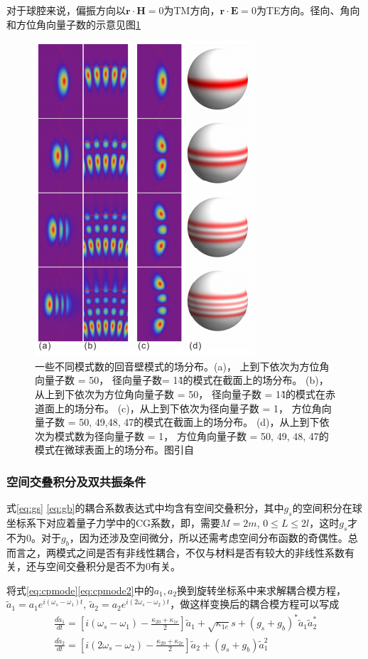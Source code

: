 \documentclass[UTF8,a4paper,cs4size,hyperref]{ctexart}
\begin{document}
对于球腔来说，偏振方向以$\mathbf{r}\cdot\mathbf{H} = 0$为TM方向，$\mathbf{r}\cdot\mathbf{E} = 0$为TE方向。径向、角向和方位角向量子数的示意见图\ref{pic:mode}
\begin{figure}
\centering
\includegraphics[scale=1 ]{mode.png}
\caption{一些不同模式数的回音壁模式的场分布。(a)， 上到下依次为方位角向量子数 = 50， 径向量子数= 1\~4的模式在截面上的场分布。 (b)，从上到下依次为方位角向量子数 = 50， 径向量子数 = 1\~4的模式在赤道面上的场分布。 (c)，从上到下依次为径向量子数 = 1， 方位角向量子数 = 50, 49,48, 47的模式在截面上的场分布。 (d)，从上到下依次为模式数为径向量子数 = 1， 方位角向量子数 = 50, 49, 48, 47的模式在微球表面上的场分布。图引自\cite{LiBeiBei2014}}
\label{pic:mode}
\end{figure}

\subsubsection{空间交叠积分及双共振条件}
\label{sec:2Resonance}
式\ref{eq:gs} \ref{eq:gb}的耦合系数表达式中均含有空间交叠积分，其中$g_s$的空间积分在球坐标系下对应着量子力学中的CG系数，即，需要$M=2m$, $0\le L \le 2l$，这时$g_s$才不为0。对于$g_b$，因为还涉及空间微分，所以还需考虑空间分布函数的奇偶性。总而言之，两模式之间是否有非线性耦合，不仅与材料是否有较大的非线性系数有关，还与空间交叠积分是否不为0有关。

将式\ref{eq:cpmode}\ref{eq:cpmode2}中的$a_1, a_2$换到旋转坐标系中来求解耦合模方程，$\tilde{a}_1 = a_1e^{i(\omega_s-\omega_1)t}$, $\tilde{a}_2 = a_2e^{i(2\omega_s-\omega_2)t}$，做这样变换后的耦合模方程可以写成
\begin{gather}
\label{eq:cpmoder}
\frac{d\tilde{a}_1}{dt} = [i(\omega_s-\omega_1)-\frac{\kappa_{20}+\kappa_{1e}}{2}]\tilde{a}_1+\sqrt{\kappa_{1e}}s+(g_s+g_b)^*\tilde{a}_1\tilde{a}_2^* \\
\frac{d\tilde{a}_2}{dt} = [i(2\omega_s-\omega_2)-\frac{\kappa_{20}+\kappa_{2e}}{2}]\tilde{a}_2+(g_s+g_b)\tilde{a}_1^2
\label{eq:cpmoder2}
\end{gather}
\end{document}
